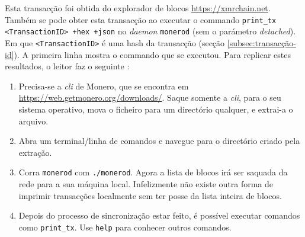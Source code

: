 Esta transacção foi obtida do explorador de blocos \url{https://xmrchain.net}. Também se pode obter esta transacção ao executar o commando {\tt print\_tx <TransactionID> +hex +json} no {\em daemon} {\tt monerod} (sem o parámetro {\em detached}). Em que {\tt <TransactionID>} é uma hash da transacção (secção \ref{subsec:transacção-id}). A primeira linha mostra o commando que se executou. 
Para replicar estes resultados, o leitor faz o seguinte :
\begin{enumerate}
    \item Precisa-se a {\em cli} de Monero, que se encontra em \url{https://web.getmonero.org/downloads/}. Saque somente a {\em cli}, para o seu sistema operativo, mova o ficheiro para um directório qualquer, e extrai-a o arquivo. 
    \item Abra um terminal/linha de comandos e navegue para o directório criado pela extração.
    \item Corra {\tt monerod} com {\tt ./monerod}. Agora a lista de blocos irá ser saquada da rede para a sua máquina local. Infelizmente não existe outra forma de imprimir transacções localmente sem ter posse da lista inteira de blocos.    
    \item Depois do processo de sincronização estar feito, é possível executar comandos como {\tt print\_tx}. Use {\tt help} para conhecer outros comandos.
\end{enumerate}

